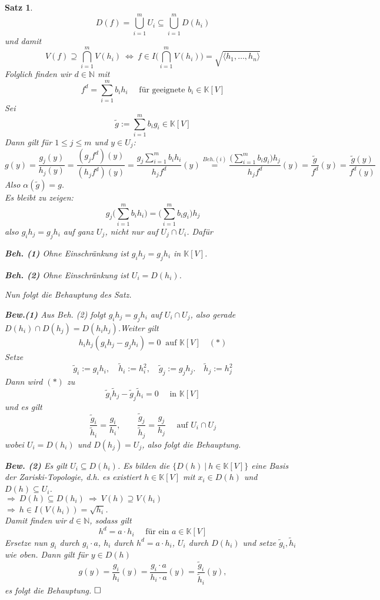 \documentclass[11pt]{book}
\newtheorem{theorem}{Satz}[section]
\theoremstyle{nonumberbreak}
\newenvironment{pr}[1][]{\ifthenelse{\equal{#1}{}}{\proof}{\proof[#1]}\rm}{\endproof}
\begin{document}
\begin{spacing}{1.3}
\begin{theorem}
\begin{pr}
$$D(f)=\bigcup_{i=1}^m U_i \subseteq \bigcup_{i=1}^m D(h_i)$$
und damit
$$V(f) \supseteq \bigcap_{i=1}^m V(h_i) \ \Longleftrightarrow \ f \in I\bigg(\bigcap_{i=1}^m V(h_i) \bigg) = \sqrt{\langle h_1, \ldots, h_n \rangle}$$
Folglich finden wir $d \in \mathbb{N}$ mit 
$$f^d = \sum_{i=1}^m b_i h_i \quad \textrm{ für geeignete } b_i \in \mathbb{K}[V]$$
Sei $$\tilde{g} := \sum_{i=1}^m b_i g_i \in \mathbb{K}[V]$$
Dann gilt für $1 \leqslant j \leqslant m$ und $y \in U_j$:
$$g(y)=\frac{g_j(y)}{h_j(y)} = \frac{(g_jf^d)(y)}{(h_jf^d)(y)} = \frac{g_j \sum_{i=1}^m b_i h_i }{h_j f^d}(y) \overset{Beh.(i)}{=} \frac{\big(\sum_{i=1}^m b_i g_i\big) h_j}{h_j f^d} (y) = \frac{\tilde{g}}{f^d}(y) = \frac{\tilde{g}(y)}{f^d(y)}$$
Also $\alpha(\tilde{g})=g$.\\
Es bleibt zu zeigen:
$$g_j \bigg( \sum_{i=1}^m b_i h_i \bigg) = \bigg( \sum_{i=1}^m b_i g_i \bigg) h_j$$
also $g_i h_j = g_j h_i$ auf ganz $U_j$, nicht nur auf $U_j \cap U_i$. Dafür
\begin{compactenum}
\item[\textbf{Beh. (1)}] Ohne Einschränkung ist $g_ih_j = g_j h_i$ in $\mathbb{K}[V]$.
\item[\textbf{Beh. (2)}] Ohne Einschränkung ist $U_i=D(h_i)$.
\end{compactenum}
Nun folgt die Behauptung des Satz.
\begin{compactenum}
\item[\textbf{Bew.(1)}] Aus Beh. (2) folgt $g_i h_j = g_jh_i$ auf $U_i \cap U_j$, also gerade $D(h_i) \cap D(h_j) = D(h_i h_j)$.Weiter gilt
$$h_i h_j (g_ih_j - g_j h_i) = 0 \ \textrm{ auf } \mathbb{K}[V]\quad (*)$$
Setze
$$\tilde{g}_i:=g_i h_i, \quad \tilde{h}_i := h_i^2, \quad \tilde{g}_j:= g_j h_j. \quad \tilde{h}_j:= h_j^2$$
Dann wird $(*)$ zu
$$\tilde{g}_i \tilde{h}_j - \tilde{g}_j \tilde{h}_i = 0 \quad \textrm{ in } \mathbb{K}[V]$$
und es gilt
$$\frac{\tilde{g}_i}{\tilde{h}_i} = \frac{g_i}{h_i}, \qquad \frac{\tilde{g}_j}{\tilde{h}_j} = \frac{g_j}{h_j} \quad \textrm{ auf } U_i \cap U_j$$
wobei $U_i=D(h_i)$ und $D(h_j)=U_j$, also folgt die Behauptung.
\item [\textbf{Bew. (2)}] Es gilt $U_i \subseteq D(h_i)$. Es bilden die $\{D(h) \ \vert \ h \in \mathbb{K}[V]\}$ eine Basis der Zariski-Topologie, d.h. es existiert $h \in \mathbb{K}[V]$ mit $x_i \in D(h)$ und $D(h) \subseteq U_i$.\\
$\Longrightarrow \ D(h) \subseteq D(h_i) \ \Longrightarrow \ V(h) \supseteq V(h_i)$\\
$\Longrightarrow \ h \in I(V(h_i)) = \sqrt{h_i}$.\\
Damit finden wir $d \in \mathbb{N}$, sodass gilt
$$h^d = a \cdot h_i \quad \textrm{ für ein } a \in \mathbb{K}[V]$$
Ersetze nun $g_i$ durch $g_i \cdot a$, $h_i$ durch $h^d=a \cdot h_i$, $U_i$ durch $D(h_i)$ und setze $\tilde{g}_i, \tilde{h}_i$ wie oben. Dann gilt für $y \in D(h)$
$$g(y)=\frac{g_i}{h_i}(y)=\frac{g_i\cdot a}{h_i \cdot a}(y)=\frac{\tilde{g}_i}{\tilde{h}_i}(y),$$
es folgt die Behauptung. $\hfill \Box$


\end{compactenum}
\end{pr}
\end{theorem}
\end{spacing}
\end{document}
